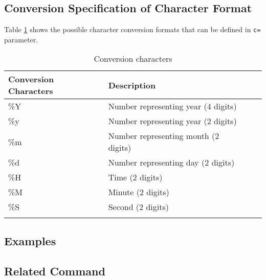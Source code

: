 \subsection*{Conversion Specification of Character Format}

Table \ref{tbl:mdformat} shows the possible character conversion formats that can be defined in \verb|c=| parameter. 


\begin{table}[htbp]
\begin{center}
\caption{Conversion characters\label{tbl:mdformat}}
{\small
\renewcommand{\arraystretch}{1.5}
\begin{tabular}{llll}
\hline
Conversion Characters & Description  \\
\hline
\%Y           & Number representing year (4 digits) \\
\%y           & Number representing year (2 digits)  \\
\%m           & Number representing month (2 digits)  \\
\%d           &  Number representing day (2 digits)  \\
\%H           & Time (2 digits) \\
\%M           & Minute (2 digits)   \\
\%S           & Second (2 digits)   \\
\hline \\
\end{tabular}
}      
\end{center}
\end{table}


\subsection*{Examples }

\subsection*{Related Command}

%
